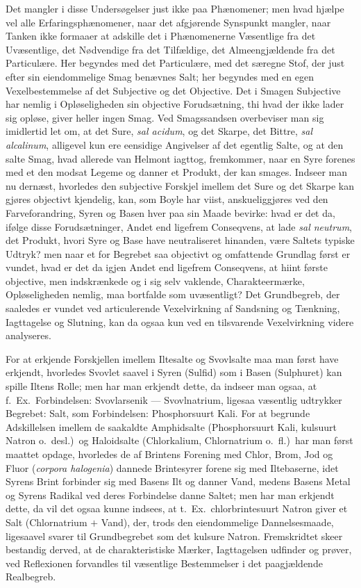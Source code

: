 \documentclass[12pt,a4paper]{book}
\begin{document}
Det mangler i disse Undersøgelser just ikke paa Phænomener;
men hvad hjælpe vel alle Erfaringsphænomener, naar
det afgjørende Synspunkt mangler, naar Tanken ikke formaaer
at adskille det i Phænomenerne Væsentlige fra det
Uvæsentlige, det Nødvendige fra det Tilfældige, det Almeengjældende
fra det Particulære. Her begyndes med det
Particulære, med det særegne Stof, der just efter sin eiendommelige
Smag benævnes Salt; her begyndes med en egen
Vexelbestemmelse af det Subjective og det Objective. Det i
Smagen Subjective har nemlig i Opløseligheden sin objective
Forudsætning, thi hvad der ikke lader sig opløse, giver heller
ingen Smag. Ved Smagssandsen overbeviser man sig imidlertid
let om, at det Sure, \textit{sal acidum}, og det Skarpe,
det Bittre, \textit{sal alcalinum}, alligevel kun ere eensidige
Angivelser af det egentlig Salte, og at den salte Smag, hvad
allerede van Helmont iagttog, fremkommer, naar en Syre
forenes med et den modsat Legeme og danner et Produkt,
der kan smages. Indseer man nu dernæst, hvorledes den
subjective Forskjel imellem det Sure og det Skarpe kan gjøres
objectivt kjendelig, kan, som Boyle har viist, anskueliggjøres
ved den Farveforandring, Syren og Basen hver paa sin
Maade bevirke: hvad er det da, ifølge disse Forudsætninger,
Andet end ligefrem Conseqvens, at lade \textit{sal neutrum}, det
Produkt, hvori Syre og Base have neutraliseret hinanden,
være Saltets typiske Udtryk? men naar et for Begrebet saa
objectivt og omfattende Grundlag først er vundet, hvad er
det da igjen Andet end ligefrem Conseqvens, at hiint første
objective, men indskrænkede og i sig selv vaklende, Charakteermærke,
Opløseligheden nemlig, maa bortfalde som uvæsentligt?
Det Grundbegreb, der saaledes er vundet ved articulerende
Vexelvirkning af Sandsning og Tænkning, Iagttagelse og
Slutning, kan da ogsaa kun ved en tilsvarende Vexelvirkning
videre analyseres.

For at erkjende Forskjellen imellem Iltesalte og Svovlsalte
maa man først have erkjendt, hvorledes Svovlet saavel
i Syren (Sulfid) som i Basen (Sulphuret) kan spille Iltens
Rolle; men har man erkjendt dette, da indseer man ogsaa,
at f.\ Ex.\ Forbindelsen: Svovlarsenik --- Svovlnatrium, ligesaa
væsentlig udtrykker Begrebet: Salt, som Forbindelsen: Phosphorsuurt
Kali. For at begrunde Adskillelsen imellem de saakaldte
Amphidsalte (Phosphorsuurt Kali, kulsuurt Natron
o.\ desl.)\ og Haloidsalte (Chlorkalium, Chlornatrium o.\ fl.)\
har man først maattet opdage, hvorledes de af Brintens
Forening med Chlor, Brom, Jod og Fluor (\textit{corpora
halogenia}) dannede Brintesyrer forene sig med Iltebaserne, idet
Syrens Brint forbinder sig med Basens Ilt og danner
Vand, medens Basens Metal og Syrens Radikal ved deres
Forbindelse danne Saltet; men har man erkjendt dette, da
vil det ogsaa kunne indsees, at t.\ Ex.\ chlorbrintesuurt Natron
giver et Salt (Chlornatrium $+$ Vand), der, trods den eiendommelige
Dannelsesmaade, ligesaavel svarer til Grundbegrebet
som det kulsure Natron. Fremskridtet skeer bestandig
derved, at de charakteristiske Mærker, Iagttagelsen udfinder
\setcounter{footnote}{0}
og prøver, ved Reflexionen forvandles til væsentlige Bestemmelser
i det paagjældende Realbegreb.
\end{document}
